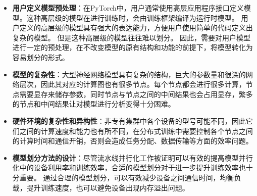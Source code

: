 \begin{itemize}
	\item \textbf{用户定义模型预处理}：在PyTorch中，用户通常使用高层应用程序接口定义模型。这种高层级的模型在进行训练时，会由训练框架编译为运行时模型。
	用户定义的高层级的模型具有强大的表达能力，方便用户使用简单的代码定义出复杂的模型。
	但是这种高层级的模型往往难以划分。
	因此，需要对用户模型进行一定的预处理，在不改变模型的原有结构和功能的前提下，将模型转化为容易划分的形式。
	\item \textbf{模型的复杂性}：大型神经网络模型具有复杂的结构，巨大的参数量和很深的网络层次，因此其对应的计算图也有很多节点。每个节点都会进行很多计算，节点需要显存来储存参数，同时节点与节点之间的中间结果也会占用显存，繁多的节点和中间结果让对模型进行分析变得十分困难。
	\item \textbf{硬件环境的复杂性和异构性}：非专有集群中各个设备的型号可能不同，因此它们之间的计算速度和能力也有所不同，在分布式训练中需要控制各个节点之间的计算时间和通信开销，否则会造成任务分配、数据传输等方面的效率问题。
	\item \textbf{模型划分方法的设计}：尽管流水线并行化工作被证明可以有效的提高模型并行化中的设备利用率和训练效率，合适的模型划分对于进一步提升训练效率也十分重要。
	通过合理的模型划分，可以有效减少设备之间通信时间，均衡负载，提升训练速度，也可以避免设备出现内存溢出问题。
\end{itemize}


